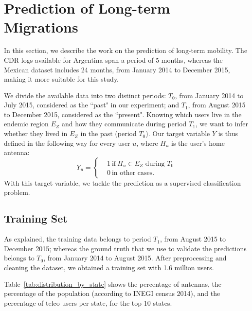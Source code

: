 




\section{Prediction of Long-term Migrations} \label{long_term}

In this section, we describe the work on the prediction of long-term mobility.
The CDR logs available for Argentina span a period of 5 months, 
whereas the Mexican dataset includes 24 months, from January 2014 to December 2015, making it more suitable for this study.

We divide the available data into two distinct periods:
$T_0$, from January 2014 to July 2015, considered as the ``past" in our experiment;
and $T_1$, from August 2015 to December 2015, considered as the ``present".
Knowing which users live in the endemic region $E_Z$ and how they communicate
during period $T_1$,
we want to infer whether they lived in $E_Z$ in the past (period $T_0$).
Our target variable $Y$ is thus defined in the following way for every user $u$,
where $H_u$ is the user's home antenna: 
\[
Y_u =
\begin{cases}
&1 \ \mbox{if} \ H_u \in E_Z \mbox{ during } T_0 \\
&0 \ \mbox{in other cases}.
\end{cases}
\]
With this target variable, we tackle the prediction as a supervised classification problem.


\subsection{Training Set}

As explained, the training data belongs to period $T_1$, from August 2015 to December 2015;
whereas the ground truth that we use to validate the predictions belongs to $T_0$, from January 2014 to August 2015.
After preprocessing and cleaning the dataset, we obtained 
a training set with 1.6 million users.

Table~\ref{tab:distribution_by_state} shows the percentage of antennas, the percentage of the population (according to INEGI census 2014), and
the percentage of telco users per state, for the top 10 states.


